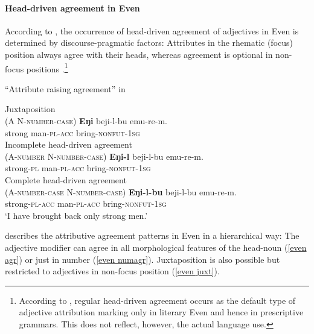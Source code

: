 \paragraph{Head-driven agreement in Even}
According to \citet[20]{malchukov1995}, the occurrence of head-driven agreement of adjectives in Even is determined by discourse-pragmatic factors: Attributes in the rhematic (focus) position always agree with their heads, whereas agreement is optional in non-focus positions \cite[31–32]{malchukov1995}.\footnote{According to \cite[31]{malchukov1995}, regular head-driven agreement occurs as the default type of adjective attribution marking only in literary Even and hence in prescriptive grammars. This does not reflect, however, the actual language use.}
\begin{exe}
\ex \label{even raising}
\rm{“Attribute raising agreement” in} 
\begin{xlist}
\ex 	Juxtaposition\\(A N-\textsc{number}-\textsc{case}) \label{even juxt}
\gll	\textbf{Eŋi} beji-l-bu emu-re-m.\\
	strong man-\textsc{pl}-\textsc{acc} bring-\textsc{nonfut}-\textsc{1sg}\\
\ex	Incomplete head-driven agreement\\(A-\textsc{number} N-\textsc{number}-\textsc{case}) \label{even numagr}
\gll	\textbf{Eŋi-l} beji-l-bu emu-re-m.\\
	strong-\textsc{pl} man-\textsc{pl}-\textsc{acc} bring-\textsc{nonfut}-\textsc{1sg}\\
\ex	Complete head-driven agreement\\(A-\textsc{number}-\textsc{case} N-\textsc{number}-\textsc{case}) \label{even agr}
\gll	\textbf{Eŋi-l-bu} beji-l-bu emu-re-m.\\
	strong-\textsc{pl}-\textsc{acc} man-\textsc{pl}-\textsc{acc} bring-\textsc{nonfut}-\textsc{1sg}\\
\glt	‘I have brought back only strong men.’
\end{xlist}
\end{exe}
\citet[30–31]{malchukov1995} describes the attributive agreement patterns in Even in a hierarchical way: The adjective modifier can agree in all morphological features of the head-noun (\ref{even agr}) or just in number (\ref{even numagr}). Juxtaposition is also possible but restricted to adjectives in non-focus position (\ref{even juxt}).


